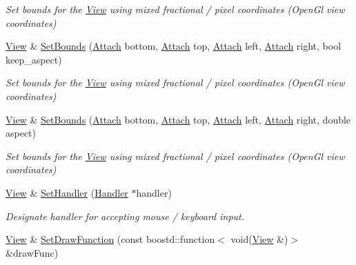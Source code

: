 \begin{DoxyCompactItemize}
\begin{DoxyCompactList}\small\item\em Set bounds for the \hyperlink{structpangolin_1_1_view}{View} using mixed fractional / pixel coordinates (Open\+Gl view coordinates) \end{DoxyCompactList}\item 
\hyperlink{structpangolin_1_1_view}{View} \& \hyperlink{structpangolin_1_1_view_a02e62c91b879a15b0a0808bd112bed04}{Set\+Bounds} (\hyperlink{structpangolin_1_1_attach}{Attach} bottom, \hyperlink{structpangolin_1_1_attach}{Attach} top, \hyperlink{structpangolin_1_1_attach}{Attach} left, \hyperlink{structpangolin_1_1_attach}{Attach} right, bool keep\+\_\+aspect)\hypertarget{structpangolin_1_1_view_a02e62c91b879a15b0a0808bd112bed04}{}\label{structpangolin_1_1_view_a02e62c91b879a15b0a0808bd112bed04}

\begin{DoxyCompactList}\small\item\em Set bounds for the \hyperlink{structpangolin_1_1_view}{View} using mixed fractional / pixel coordinates (Open\+Gl view coordinates) \end{DoxyCompactList}\item 
\hyperlink{structpangolin_1_1_view}{View} \& \hyperlink{structpangolin_1_1_view_aa6c8327dda338d59b58e50e0f111c908}{Set\+Bounds} (\hyperlink{structpangolin_1_1_attach}{Attach} bottom, \hyperlink{structpangolin_1_1_attach}{Attach} top, \hyperlink{structpangolin_1_1_attach}{Attach} left, \hyperlink{structpangolin_1_1_attach}{Attach} right, double aspect)\hypertarget{structpangolin_1_1_view_aa6c8327dda338d59b58e50e0f111c908}{}\label{structpangolin_1_1_view_aa6c8327dda338d59b58e50e0f111c908}

\begin{DoxyCompactList}\small\item\em Set bounds for the \hyperlink{structpangolin_1_1_view}{View} using mixed fractional / pixel coordinates (Open\+Gl view coordinates) \end{DoxyCompactList}\item 
\hyperlink{structpangolin_1_1_view}{View} \& \hyperlink{structpangolin_1_1_view_aee1aeff91d515d1bd71cfd564ef6468e}{Set\+Handler} (\hyperlink{structpangolin_1_1_handler}{Handler} $\ast$handler)\hypertarget{structpangolin_1_1_view_aee1aeff91d515d1bd71cfd564ef6468e}{}\label{structpangolin_1_1_view_aee1aeff91d515d1bd71cfd564ef6468e}

\begin{DoxyCompactList}\small\item\em Designate handler for accepting mouse / keyboard input. \end{DoxyCompactList}\item 
\hyperlink{structpangolin_1_1_view}{View} \& \hyperlink{structpangolin_1_1_view_a50159729a9613af04642b2ec1a03a2b2}{Set\+Draw\+Function} (const boostd\+::function$<$ void(\hyperlink{structpangolin_1_1_view}{View} \&)$>$ \&draw\+Func)\hypertarget{structpangolin_1_1_view_a50159729a9613af04642b2ec1a03a2b2}{}\label{structpangolin_1_1_view_a50159729a9613af04642b2ec1a03a2b2}


\end{DoxyCompactItemize}

